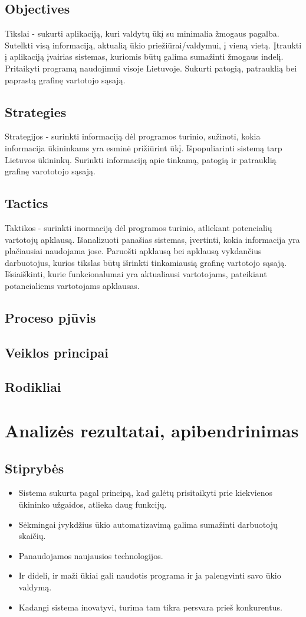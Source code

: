 \documentclass[oneside]{VUMIFPSkursinis}
\begin{document}
\subsection{Objectives}
Tikslai - sukurti aplikaciją, kuri valdytų ūkį su minimalia žmogaus pagalba.
Sutelkti visą informaciją, aktualią ūkio priežiūrai/valdymui, į vieną vietą.
Įtraukti į aplikaciją įvairias sistemas, kuriomis būtų galima sumažinti žmogaus indelį.
Pritaikyti programą naudojimui visoje Lietuvoje.
Sukurti patogią, patrauklią bei paprastą grafinę vartotojo sąsają.
\subsection{Strategies}
Strategijos - surinkti informaciją dėl programos turinio, sužinoti, kokia informacija ūkininkams yra esminė prižiūrint ūkį.
Išpopuliarinti sistemą tarp Lietuvos ūkininkų.
Surinkti informaciją apie tinkamą, patogią ir patrauklią grafinę varototojo sąsają.
\subsection{Tactics}
Taktikos - surinkti inormaciją dėl programos turinio, atliekant potencialių vartotojų apklausą.
Išanalizuoti panašias sistemas, įvertinti, kokia informacija yra plačiausiai naudojama jose.
Paruošti apklausą bei apklausą vykdančius darbuotojus, kurios tikslas būtų išrinkti tinkamiausią grafinę vartotojo sąsają.
Išsiaiškinti, kurie funkcionalumai yra aktualiausi vartotojams, pateikiant potancialiems vartotojams apklausas.
	\subsection{Proceso pjūvis}
	\subsection{Veiklos principai}
	\subsection{Rodikliai}
\section{Analizės rezultatai, apibendrinimas}
	\subsection{Stiprybės}
	\begin{itemize}
	\item Sistema sukurta pagal principą, kad galėtų prisitaikyti prie kiekvienos ūkininko užgaidos, atlieka daug funkcijų.
	\item Sėkmingai įvykdžius ūkio automatizavimą galima sumažinti darbuotojų skaičių.
	\item Panaudojamos naujausios technologijos.
	\item Ir dideli, ir maži ūkiai gali naudotis programa ir ja palengvinti savo ūkio valdymą.
	\item Kadangi sistema inovatyvi, turima tam tikra persvara prieš konkurentus.
	\end{itemize}
\end{document}
